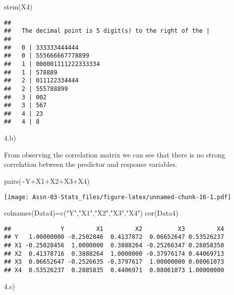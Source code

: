 \documentclass[
]{article}
\newenvironment{Shaded}{\begin{snugshade}}{\end{snugshade}}
\newcommand{\FunctionTok}[1]{\textcolor[rgb]{0.00,0.00,0.00}{#1}}
\newcommand{\NormalTok}[1]{#1}
\newcommand{\OtherTok}[1]{\textcolor[rgb]{0.56,0.35,0.01}{#1}}
\newcommand{\SpecialCharTok}[1]{\textcolor[rgb]{0.00,0.00,0.00}{#1}}
\newcommand{\StringTok}[1]{\textcolor[rgb]{0.31,0.60,0.02}{#1}}
\begin{document}
\begin{Shaded}
\begin{Highlighting}[]
\FunctionTok{stem}\NormalTok{(X4)}
\end{Highlighting}
\end{Shaded}

\begin{verbatim}
## 
##   The decimal point is 5 digit(s) to the right of the |
## 
##   0 | 333333444444
##   0 | 555666667778899
##   1 | 000001111222333334
##   1 | 578889
##   2 | 011122334444
##   2 | 555788899
##   3 | 002
##   3 | 567
##   4 | 23
##   4 | 8
\end{verbatim}

4.b)

From observing the correlation matrix we can see that there is no strong
correlation between the predictor and response variables.

\begin{Shaded}
\begin{Highlighting}[]
\FunctionTok{pairs}\NormalTok{(}\SpecialCharTok{\textasciitilde{}}\NormalTok{Y}\SpecialCharTok{+}\NormalTok{X1}\SpecialCharTok{+}\NormalTok{X2}\SpecialCharTok{+}\NormalTok{X3}\SpecialCharTok{+}\NormalTok{X4)}
\end{Highlighting}
\end{Shaded}

\texttt{[image: Assn-03-Stats\_files/figure-latex/unnamed-chunk-16-1.pdf]}

\begin{Shaded}
\begin{Highlighting}[]
\FunctionTok{colnames}\NormalTok{(Data4)}\OtherTok{=}\FunctionTok{c}\NormalTok{(}\StringTok{"Y"}\NormalTok{,}\StringTok{"X1"}\NormalTok{,}\StringTok{"X2"}\NormalTok{,}\StringTok{"X3"}\NormalTok{,}\StringTok{"X4"}\NormalTok{)}
\FunctionTok{cor}\NormalTok{(Data4)}
\end{Highlighting}
\end{Shaded}

\begin{verbatim}
##              Y         X1         X2          X3         X4
## Y   1.00000000 -0.2502846  0.4137872  0.06652647 0.53526237
## X1 -0.25028456  1.0000000  0.3888264 -0.25266347 0.28858350
## X2  0.41378716  0.3888264  1.0000000 -0.37976174 0.44069713
## X3  0.06652647 -0.2526635 -0.3797617  1.00000000 0.08061073
## X4  0.53526237  0.2885835  0.4406971  0.08061073 1.00000000
\end{verbatim}

4.c)
\end{document}
